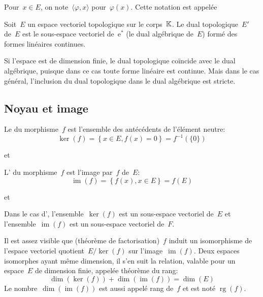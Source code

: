 \medskip
Pour~$x \in E$, on note~$\langle\varphi,x\rangle$ pour~$\varphi(x)$.
Cette notation est appelée 

\medskip
\begin{definition}
Soit~$E$ un espace vectoriel topologique sur le corps~$\mathbb K$.
Le dual topologique~$E'$ de~$E$ est le sous-espace vectoriel de~$\mathrm{e}^*$ (le dual algébrique de~$E$) formé des formes linéaires continues.
\end{definition}
Si l'espace est de dimension finie, le dual topologique coïncide avec le dual algébrique, puisque dans ce cas toute forme linéaire est continue.
Mais dans le cas général, l'inclusion du dual topologique dans le dual algébrique est stricte.

\medskip
\subsection{Noyau et image}

\begin{definition}[Noyau]
Le  du morphisme~$f$ est l'ensemble des antécédents de l'élément neutre:
\begin{equation}
  \ker(f)=\left\{x\in E, f(x)=0\right\}=f^{-1}(\{0\})\end{equation}
\end{definition}
et 

\medskip
\begin{definition}[Image]
L' du morphisme~$f$ est l'image par~$f$ de~$E$:
\begin{equation}
 \operatorname{im}(f)=\left\{ f(x), x\in E\right\}=f(E)\end{equation}
\end{definition}
et 

\medskip
Dans le cas d',
l'ensemble~$\ker(f)$ est un sous-espace vectoriel de~$E$ et
l'ensemble~$\operatorname{im}(f)$ est un sous-espace vectoriel de~$F$.

\begin{theoreme}
Il est assez visible que (théorème de factorisation)~$f$ induit un isomorphisme de l'espace vectoriel quotient~$E/\ker(f)$ sur l'image~$\operatorname{im}(f)$.
Deux espaces isomorphes ayant même dimension, il s'en suit la relation, valable pour un espace~$E$ de dimension finie, appelée théorème du rang:
\begin{equation}
  \dim(\ker(f)) + \dim(\operatorname{im}(f)) = \dim( E )
\end{equation}
Le nombre~$\dim(\operatorname{im}(f))$ est aussi appelé rang de~$f$ et est noté
$\operatorname{rg}(f)$.
\end{theoreme}

